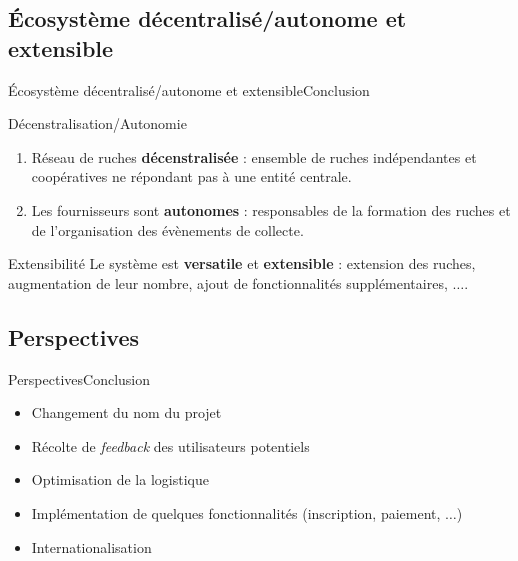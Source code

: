 \documentclass[usenames,dvipsnames]{beamer}
\begin{document}
\subsection{Écosystème décentralisé/autonome et extensible}
\begin{frame}{Écosystème décentralisé/autonome et extensible}{Conclusion}

\begin{block}{Décenstralisation/Autonomie}
\begin{enumerate}
  \item Réseau de ruches \textbf{décenstralisée} : ensemble de ruches indépendantes et coopératives ne répondant pas à une entité centrale.
  \item Les fournisseurs sont \textbf{autonomes} : responsables de la formation des ruches et de l'organisation des évènements de collecte.
\end{enumerate}
\end{block}

\begin{block}{Extensibilité}
Le système est \textbf{versatile} et \textbf{extensible} : extension des ruches, augmentation de leur nombre, ajout de fonctionnalités supplémentaires, $\dots$.
\end{block}
\end{frame}

\subsection{Perspectives}
\begin{frame}{Perspectives}{Conclusion}
 \begin{itemize}
   \item Changement du nom du projet
   \item Récolte de \textit{feedback} des utilisateurs potentiels
   \item Optimisation de la logistique
   \item Implémentation de quelques fonctionnalités (inscription, paiement, $\dots$)
   \item Internationalisation
 \end{itemize}
\end{frame}
\end{document}
